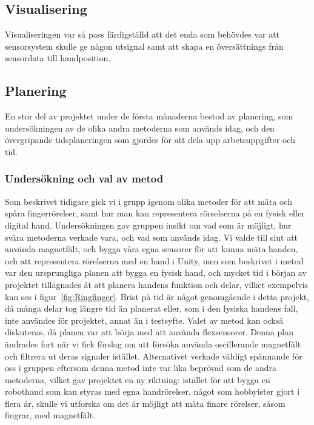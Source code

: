 \documentclass[a4paper]{article}
\makeatletter
\let\\\@raggedtwoe@savedcr%
\makeatother
\begin{document}
\begin{sloppypar}
    \subsection{Visualisering}
    Visualiseringen var så pass färdigställd att det enda som behövdes var att sensorsystem skulle ge någon utsignal samt att skapa en översättnings från sensordata till handposition.

    \subsection{Planering}
    En stor del av projektet under de första månaderna bestod av planering, som undersökningen av de olika andra metoderna som används idag, och den övergripande tidsplaneringen som gjordes för att dela upp arbetsuppgifter och tid.
    \subsubsection{Undersökning och val av metod}
    Som beskrivet tidigare gick vi i grupp igenom olika metoder för att mäta och spåra fingerrörelser, samt hur man kan representera rörselserna på en fysisk eller digital hand.
    Undersökningen gav gruppen insikt om vad som är möjligt, hur svåra metoderna verkade vara, och vad som används idag.
    Vi valde till slut att använda magnetfält, och bygga våra egna sensorer för att kunna mäta handen, och att representera rörelserna med en hand i Unity, men som beskrivet i metod var den ursprungliga planen att bygga en fysisk hand, och mycket tid i början av projektet tillägnades åt att planera handens funktion och delar, vilket exempelvis kan ses i figur~\ref{fig:Ringfinger}.
    Brist på tid är något genomgående i detta projekt, då många delar tog längre tid än planerat eller, som i den fysiska handens fall, inte användes för projektet, annat än i testsyfte.
    \\\\
    Valet av metod kan också diskuteras, då planen var att börja med att använda flexsensorer. Denna plan ändrades fort när vi fick förslag om att försöka använda oscillerande magnetfält och filtrera ut deras signaler istället.
    Alternativet verkade väldigt spännande för oss i gruppen eftersom denna metod inte var lika beprövad som de andra metoderna, vilket gav projektet en ny riktning: istället för att bygga en robothand som kan styras med egna handrörelser, något som hobbyister gjort i flera år, skulle vi utforska om det är möjligt att mäta finare rörelser, såsom fingrar, med magnetfält.

\end{sloppypar}
\end{document}
